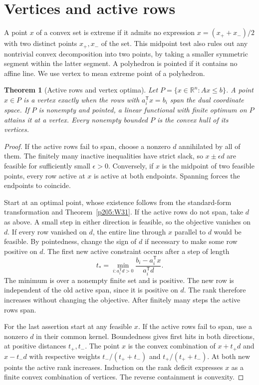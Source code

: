 \documentclass[11pt,oneside,openany]{book}
\theoremstyle{plain}
\newtheorem{theorem}{Theorem}[chapter]
\theoremstyle{definition}
\theoremstyle{remark}
\begin{document}
\section{Vertices and active rows}

A point \(x\) of a convex set is extreme if it admits no expression
\(x=(x_++x_-)/2\) with two distinct points \(x_+,x_-\) of the set.
This midpoint test also rules out any nontrivial convex
decomposition into two points, by taking a smaller symmetric
segment within the latter segment. A polyhedron is pointed if it
contains no affine line. We use vertex to mean extreme point of a
polyhedron.

\begin{theorem}[Active rows and vertex optima]\label{p205:W32}
Let \(P=\{x\in\mathbb R^n:Ax\le b\}\). A point \(x\in P\) is a vertex
exactly when the rows with \(a_i^{\mathsf T}x=b_i\) span the dual
coordinate space. If \(P\) is nonempty and pointed, a linear
functional with finite optimum on \(P\) attains it at a vertex.
Every nonempty bounded \(P\) is the convex hull of its vertices.
\end{theorem}

\begin{proof}
If the active rows fail to span, choose a nonzero \(d\) annihilated
by all of them. The finitely many inactive inequalities have
strict slack, so \(x\pm\epsilon d\) are feasible for sufficiently
small \(\epsilon>0\). Conversely, if \(x\) is the midpoint of two
feasible points, every row active at \(x\) is active at both
endpoints. Spanning forces the endpoints to coincide.

Start at an optimal point, whose existence follows from the
standard-form transformation and Theorem~\ref{p205:W31}.
If the active rows do not span, take \(d\) as above. A small step
in either direction is feasible, so the objective vanishes on \(d\).
If every row vanished on \(d\), the entire line through \(x\)
parallel to \(d\) would be feasible. By pointedness, change the
sign of \(d\) if necessary to make some row positive on \(d\).
The first new active constraint occurs after a step of length
\[
 t_*=\min_{i:a_i^{\mathsf T}d>0}
          \frac{b_i-a_i^{\mathsf T}x}{a_i^{\mathsf T}d}.
\]
The minimum is over a nonempty finite set and is positive. The new
row is independent of the old active span, since it is positive
on \(d\). The rank therefore increases without changing the
objective. After finitely many steps the active rows span.

For the last assertion start at any feasible \(x\). If the active
rows fail to span, use a nonzero \(d\) in their common kernel.
Boundedness gives first hits in both directions, at positive
distances \(t_+,t_-\). The point \(x\) is the convex combination of
\(x+t_+d\) and \(x-t_-d\) with respective weights
\(t_-/(t_++t_-)\) and \(t_+/(t_++t_-)\). At both new points
the active rank increases. Induction on the rank deficit expresses
\(x\) as a finite convex combination of vertices. The reverse
containment is convexity.
\end{proof}
\end{document}
